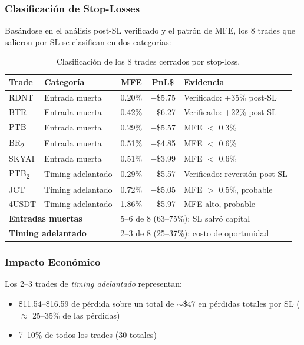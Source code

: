 \documentclass[11pt,a4paper]{article}
\begin{document}
\subsubsection{Clasificaci\'on de Stop-Losses}

Bas\'andose en el an\'alisis post-SL verificado y el patr\'on de MFE,
los 8 trades que salieron por SL se clasifican en dos categor\'ias:

\begin{table}[H]
\centering
\caption{Clasificaci\'on de los 8 trades cerrados por stop-loss.}
\label{tab:sl_classification}
\begin{tabular}{llccl}
\toprule
\textbf{Trade} & \textbf{Categor\'ia} & \textbf{MFE} & \textbf{PnL\$} & \textbf{Evidencia} \\
\midrule
RDNT & Entrada muerta & 0.20\% & $-$\$5.75 & Verificado: +35\% post-SL \\
BTR & Entrada muerta & 0.42\% & $-$\$6.27 & Verificado: +22\% post-SL \\
PTB\textsubscript{1} & Entrada muerta & 0.29\% & $-$\$5.57 & MFE $<$ 0.3\% \\
BR\textsubscript{2} & Entrada muerta & 0.51\% & $-$\$4.85 & MFE $<$ 0.6\% \\
SKYAI & Entrada muerta & 0.51\% & $-$\$3.99 & MFE $<$ 0.6\% \\
\midrule
PTB\textsubscript{2} & Timing adelantado & 0.29\% & $-$\$5.57 & Verificado: reversi\'on post-SL \\
JCT & Timing adelantado & 0.72\% & $-$\$5.05 & MFE $>$ 0.5\%, probable \\
4USDT & Timing adelantado & 1.86\% & $-$\$5.97 & MFE alto, probable \\
\midrule
\multicolumn{2}{l}{\textbf{Entradas muertas}} & \multicolumn{3}{l}{5--6 de 8 (63--75\%): SL salv\'o capital} \\
\multicolumn{2}{l}{\textbf{Timing adelantado}} & \multicolumn{3}{l}{2--3 de 8 (25--37\%): costo de oportunidad} \\
\bottomrule
\end{tabular}
\end{table}

\subsubsection{Impacto Econ\'omico}

Los 2--3 trades de \textit{timing adelantado} representan:
\begin{itemize}[leftmargin=2em]
\item \$11.54--\$16.59 de p\'erdida sobre un total de $\sim$\$47 en
  p\'erdidas totales por SL ($\approx$ 25--35\% de las p\'erdidas)
\item 7--10\% de todos los trades (30 totales)
\end{itemize}
\end{document}
